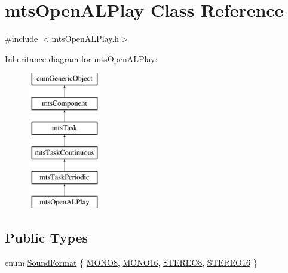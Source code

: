 \hypertarget{classmts_open_a_l_play}{\section{mts\-Open\-A\-L\-Play Class Reference}
\label{classmts_open_a_l_play}
}


{\ttfamily \#include $<$mts\-Open\-A\-L\-Play.\-h$>$}

Inheritance diagram for mts\-Open\-A\-L\-Play\-:\begin{figure}[H]
\begin{center}
\leavevmode
\includegraphics[height=6.000000cm]{d7/ddc/classmts_open_a_l_play}
\end{center}
\end{figure}
\subsection*{Public Types}
\begin{DoxyCompactItemize}
\item 
enum \hyperlink{classmts_open_a_l_play_a88d698e1caaf2a80b4eb8e50fdc45b8f}{Sound\-Format} \{ \hyperlink{classmts_open_a_l_play_a88d698e1caaf2a80b4eb8e50fdc45b8fa64a9772c3cf057b08068fe6c20a01660}{M\-O\-N\-O8}, 
\hyperlink{classmts_open_a_l_play_a88d698e1caaf2a80b4eb8e50fdc45b8faa2682e9a5aaff73a15e87702ecfc5ba4}{M\-O\-N\-O16}, 
\hyperlink{classmts_open_a_l_play_a88d698e1caaf2a80b4eb8e50fdc45b8fab307998f8248e825c4fbb43a023bace6}{S\-T\-E\-R\-E\-O8}, 
\hyperlink{classmts_open_a_l_play_a88d698e1caaf2a80b4eb8e50fdc45b8fa926c76550b48a2b3acd9401e0b872872}{S\-T\-E\-R\-E\-O16}
 \}
\end{DoxyCompactItemize}
